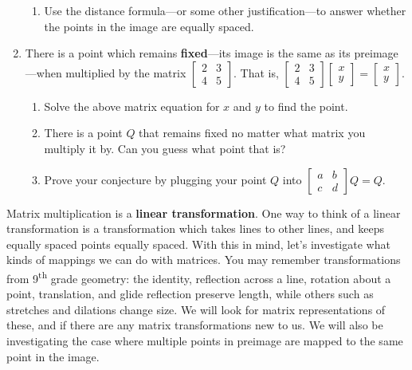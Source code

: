\documentclass[../gatm.tex]{subfiles}
\begin{document}
\begin{enumerate}
\begin{enumerate}
\item Use the distance formula---or some other justification---to answer whether the points in the image are equally spaced.
\end{enumerate}
\item There is a point which remains \textbf{fixed}---its image is the same as its preimage---when multiplied by the matrix $\left[\begin{array}{cc}2 & 3 \\ 4 & 5 \end{array}\right]$. That is, $\left[\begin{array}{cc}2 & 3 \\ 4 & 5 \end{array}\right]\left[\begin{array}{c} x \\ y \end{array}\right]=\left[\begin{array}{c} x \\ y \end{array}\right]$.
\begin{enumerate}
\item Solve the above matrix equation for $x$ and $y$ to find the point.
\item There is a point $Q$ that remains fixed no matter what matrix you multiply it by. Can you guess what point that is?
\item Prove your conjecture by plugging your point $Q$ into $\left[\begin{array}{cc}a & b \\ c & d\end{array}\right]Q=Q$.
\end{enumerate}
\setcounter{mp_problem_i}{\value{enumi}}
\end{enumerate}

\noindent Matrix multiplication is a \textbf{linear transformation}. One way to think of a linear transformation is a transformation which takes lines to other lines, and keeps equally spaced points equally spaced. With this in mind, let's investigate what kinds of mappings we can do with matrices. You may remember transformations from 9\textsuperscript{th} grade geometry: the identity, reflection across a line, rotation about a point, translation, and glide reflection preserve length, while others such as stretches and dilations change size. We will look for matrix representations of these, and if there are any matrix transformations new to us. We will also be investigating the case where multiple points in preimage are mapped to the same point in the image.
\end{document}
